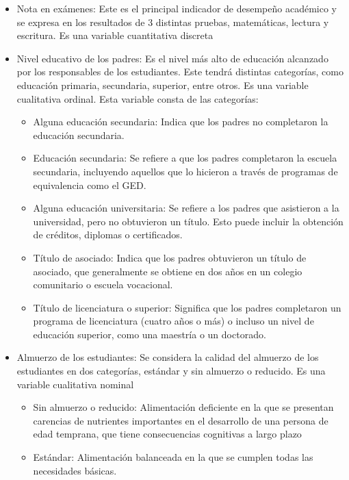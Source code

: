 \documentclass[
]{article}
\providecommand{\tightlist}{%
  \setlength{\itemsep}{0pt}\setlength{\parskip}{0pt}}
\begin{document}
\begin{itemize}
\tightlist
\item
  Nota en exámenes: Este es el principal indicador de desempeño
  académico y se expresa en los resultados de 3 distintas pruebas,
  matemáticas, lectura y escritura. Es una variable cuantitativa
  discreta
\item
  Nivel educativo de los padres: Es el nivel más alto de educación
  alcanzado por los responsables de los estudiantes. Este tendrá
  distintas categorías, como educación primaria, secundaria, superior,
  entre otros. Es una variable cualitativa ordinal. Esta variable consta
  de las categorías:

  \begin{itemize}
  \item
    Alguna educación secundaria: Indica que los padres no completaron la
    educación secundaria.
  \item
    Educación secundaria: Se refiere a que los padres completaron la
    escuela secundaria, incluyendo aquellos que lo hicieron a través de
    programas de equivalencia como el GED.
  \item
    Alguna educación universitaria: Se refiere a los padres que
    asistieron a la universidad, pero no obtuvieron un título. Esto
    puede incluir la obtención de créditos, diplomas o certificados.
  \item
    Título de asociado: Indica que los padres obtuvieron un título de
    asociado, que generalmente se obtiene en dos años en un colegio
    comunitario o escuela vocacional.
  \item
    Título de licenciatura o superior: Significa que los padres
    completaron un programa de licenciatura (cuatro años o más) o
    incluso un nivel de educación superior, como una maestría o un
    doctorado.
  \end{itemize}
\item
  Almuerzo de los estudiantes: Se considera la calidad del almuerzo de
  los estudiantes en dos categorías, estándar y sin almuerzo o reducido.
  Es una variable cualitativa nominal

  \begin{itemize}
  \tightlist
  \item
    Sin almuerzo o reducido: Alimentación deficiente en la que se
    presentan carencias de nutrientes importantes en el desarrollo de
    una persona de edad temprana, que tiene consecuencias cognitivas a
    largo plazo
  \item
    Estándar: Alimentación balanceada en la que se cumplen todas las
    necesidades básicas.
  \end{itemize}
\end{itemize}
\end{document}
